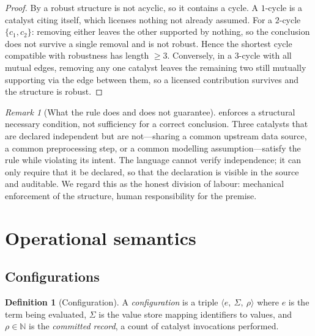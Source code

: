 \documentclass[11pt,a4paper]{article}
\theoremstyle{thmstyle}
\theoremstyle{definition}
\newtheorem{definition}[theorem]{Definition}
\theoremstyle{remark}
\newtheorem{remark}[theorem]{Remark}
\newcommand{\N}{\mathbb{N}}
\newcommand{\store}{\Sigma}
\begin{document}
\begin{proof}
By  a robust structure is not acyclic, so it contains a
cycle. A $1$-cycle is a catalyst citing itself, which licenses nothing not
already assumed. For a $2$-cycle $\{c_1,c_2\}$: removing either leaves the
other supported by nothing, so the conclusion does not survive a single
removal and is not robust. Hence the shortest cycle compatible with
robustness has length $\ge3$. Conversely, in a $3$-cycle with all mutual
edges, removing any one catalyst leaves the remaining two still mutually
supporting via the edge between them, so a licensed contribution survives
and the structure is robust.
\end{proof}

\begin{remark}[What the rule does and does not guarantee]
\label{rem:coh-limits}
 enforces a structural necessary condition, not
sufficiency for a correct conclusion. Three catalysts that are declared
independent but are not---sharing a common upstream data source, a common
preprocessing step, or a common modelling assumption---satisfy the rule
while violating its intent. The language cannot verify independence; it can
only require that it be declared, so that the declaration is visible in the
source and auditable. We regard this as the honest division of labour:
mechanical enforcement of the structure, human responsibility for the
premise.
\end{remark}

\section{Operational semantics}
\label{sec:semantics}

\subsection{Configurations}

\begin{definition}[Configuration]
\label{def:config}
A \emph{configuration} is a triple
$\langle e,\ \store,\ \rho\rangle$ where $e$ is the term being evaluated,
$\store$ is the value store mapping identifiers to values, and
$\rho\in\N$ is the \emph{committed record}, a count of catalyst invocations
performed.
\end{definition}
\end{document}
